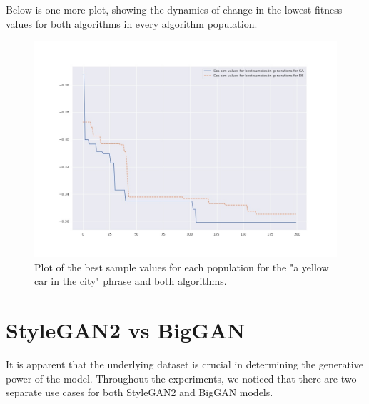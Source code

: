 \documentclass[11pt,a4paper,openany]{book}
\begin{document}
\noindent Below is one more plot, showing the dynamics of change in the lowest fitness values for both algorithms in every algorithm population.
\begin{figure}[H]
	\centering
    \includegraphics[scale=0.4]{figs/best_both.jpg}
    \caption{Plot of the best sample values for each population for the "a yellow car in the city" phrase and both algorithms.}\label{Fig:STYLEGAN}
\end{figure}

\section{StyleGAN2 vs BigGAN}

\noindent It is apparent that the underlying dataset is crucial in determining the generative power of the model. Throughout the experiments, we noticed that there are two separate use cases for both StyleGAN2 and BigGAN models. 
\end{document}
